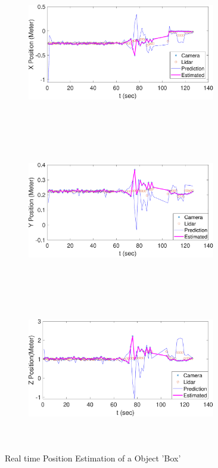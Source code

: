 \begin{figure}
    \centering
    \begin{subfigure}
        \centering
        \includegraphics[height=6.5cm,width=0.9\textwidth]{Images/X_posbox.pdf}
    \end{subfigure}
    \begin{subfigure}
        \centering
        \includegraphics[height=6.5cm,width=0.9\textwidth]{Images/Y_posbox.pdf}
    \end{subfigure}
    \begin{subfigure}
        \centering
        \includegraphics[height=6.5cm,width=0.9\textwidth]{Images/Z_posbox.pdf}
    \end{subfigure}
    \caption{Real time Position Estimation of a Object 'Box'}
    \label{Stateestbox}
\end{figure}

